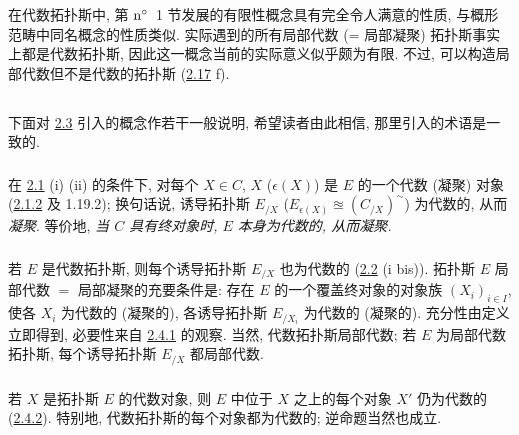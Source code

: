 \setcounter{subsection}{3}
\subsubsection{}
在代数拓扑斯中,
第 ${\rm n^{\circ}}$~1 节发展的有限性概念具有完全令人满意的性质,
与概形范畴中同名概念的性质类似.
实际遇到的所有局部代数 (= 局部凝聚) 拓扑斯事实上都是代数拓扑斯,
因此这一概念当前的实际意义似乎颇为有限.
不过, 可以构造局部代数但不是代数的拓扑斯
(\hyperref[VI.exer2.17]{2.17} f).




\subsection{}
下面对 \hyperref[VI.def2.3]{2.3} 引入的概念作若干一般说明,
希望读者由此相信, 那里引入的术语是一致的.

\subsubsection{}
在 \hyperref[VI.prop2.1]{2.1} (i) \resp (ii) 的条件下,
对每个 $X\in C$, $X$ (\resp $\epsilon(X)$)
是 $E$ 的一个代数 (凝聚) 对象
(\hyperref[VI.cor2.1.2]{2.1.2} 及 1.19.2);
换句话\pageoriginale{}说,
诱导拓扑斯 $E_{/X}$
(\resp $E_{\epsilon(X)}\approxeq(C_{/X})^{\sim}$)
为代数的, 从而\emph{凝聚}.
等价地, \emph{当 $C$ 具有终对象时, $E$ 本身为代数的, 从而凝聚.}

\subsubsection{}
若 $E$ 是代数拓扑斯,
则每个诱导拓扑斯 $E_{/X}$ 也为代数的
(\hyperref[VI.prop2.2]{2.2} (i bis)).
拓扑斯 $E$ 局部代数 $=$ 局部凝聚的充要条件是:
存在 $E$ 的一个覆盖终对象的对象族 $(X_i)_{i\in I}$,
使各 $X_i$ 为代数的 (\resp 凝聚的),
\ie 各诱导拓扑斯 $E_{/X_i}$ 为代数的 (\resp 凝聚的).
充分性由定义立即得到,
必要性来自 \hyperref[VI.subsubsec2.4.1]{2.4.1} 的观察.
当然, 代数拓扑斯局部代数;
若 $E$ 为局部代数拓扑斯, 每个诱导拓扑斯 $E_{/X}$ 都局部代数.

\subsubsection{}
若 $X$ 是拓扑斯 $E$ 的代数对象,
则 $E$ 中位于 $X$ 之上的每个对象 $X'$ 仍为代数的
(\cf \hyperref[VI.subsubsec2.4.2]{2.4.2}).
特别地, 代数拓扑斯的每个对象都为代数的; 逆命题当然也成立.

